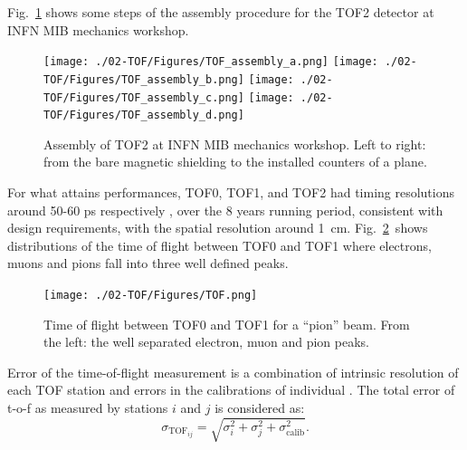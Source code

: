 Fig.~\ref{fig:TOF2} shows some steps of the assembly procedure for the TOF2
detector at INFN MIB mechanics workshop.
\begin{figure}
  \begin{center}
  \texttt{[image: ./02-TOF/Figures/TOF\_assembly\_a.png]}
  \texttt{[image: ./02-TOF/Figures/TOF\_assembly\_b.png]}
  \texttt{[image: ./02-TOF/Figures/TOF\_assembly\_c.png]}
  \texttt{[image: ./02-TOF/Figures/TOF\_assembly\_d.png]}
  \caption{Assembly of TOF2 at INFN MIB mechanics workshop. Left to right: from the bare magnetic shielding to the installed counters of a plane.}
  \label{fig:TOF2}
  \end{center}
\end{figure}




 For what attains performances\malert{---},
TOF0, TOF1, and TOF2 had timing resolutions around 50-60 ps
respectively , over the 8
years running period, consistent with design requirements, with the
spatial resolution around 1~cm.   Fig.~\ref{fig:TOF3}~shows distributions of
the time of flight between TOF0 and TOF1 where electrons, muons and
pions fall into three well defined peaks.
\begin{figure}
  \begin{center}
    \texttt{[image: ./02-TOF/Figures/TOF.png]}
    \caption{Time of flight between TOF0 and TOF1 for a ``pion''
      beam. From the left: the well separated electron, muon and pion
      peaks.}
    \label{fig:TOF3}
  \end{center}
\end{figure}




Error of the time-of-flight measurement is a combination of intrinsic
resolution of each TOF station and errors in the calibrations of
individual . The total error of t-o-f
as measured by stations $i$ and $j$ is considered as:
%
\begin{equation}
  \label{eq:tof:err}
  \sigma_{\text{TOF}_{ij}} = \sqrt{ \sigma^2_{i} + \sigma^2_{j} +
    \sigma^2_{\text{calib}} } .
\end{equation}

